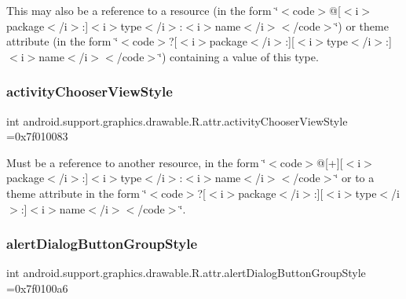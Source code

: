 This may also be a reference to a resource (in the form \char`\"{}$<$code$>$@\mbox{[}$<$i$>$package$<$/i$>$\+:\mbox{]}$<$i$>$type$<$/i$>$\+:$<$i$>$name$<$/i$>$$<$/code$>$\char`\"{}) or theme attribute (in the form \char`\"{}$<$code$>$?\mbox{[}$<$i$>$package$<$/i$>$\+:\mbox{]}\mbox{[}$<$i$>$type$<$/i$>$\+:\mbox{]}$<$i$>$name$<$/i$>$$<$/code$>$\char`\"{}) containing a value of this type. \mbox{\label{classandroid_1_1support_1_1graphics_1_1drawable_1_1R_1_1attr_a6639e407925b9b20f8c25c789f22f1b0}} 
\subsubsection{\texorpdfstring{activity\+Chooser\+View\+Style}{activityChooserViewStyle}}
{\footnotesize\ttfamily int android.\+support.\+graphics.\+drawable.\+R.\+attr.\+activity\+Chooser\+View\+Style =0x7f010083\hspace{0.3cm}{\ttfamily [static]}}

Must be a reference to another resource, in the form \char`\"{}$<$code$>$@\mbox{[}+\mbox{]}\mbox{[}$<$i$>$package$<$/i$>$\+:\mbox{]}$<$i$>$type$<$/i$>$\+:$<$i$>$name$<$/i$>$$<$/code$>$\char`\"{} or to a theme attribute in the form \char`\"{}$<$code$>$?\mbox{[}$<$i$>$package$<$/i$>$\+:\mbox{]}\mbox{[}$<$i$>$type$<$/i$>$\+:\mbox{]}$<$i$>$name$<$/i$>$$<$/code$>$\char`\"{}. \mbox{\label{classandroid_1_1support_1_1graphics_1_1drawable_1_1R_1_1attr_a97467d416cceed5027207e57944d8b98}} 
\subsubsection{\texorpdfstring{alert\+Dialog\+Button\+Group\+Style}{alertDialogButtonGroupStyle}}
{\footnotesize\ttfamily int android.\+support.\+graphics.\+drawable.\+R.\+attr.\+alert\+Dialog\+Button\+Group\+Style =0x7f0100a6\hspace{0.3cm}{\ttfamily [static]}}

